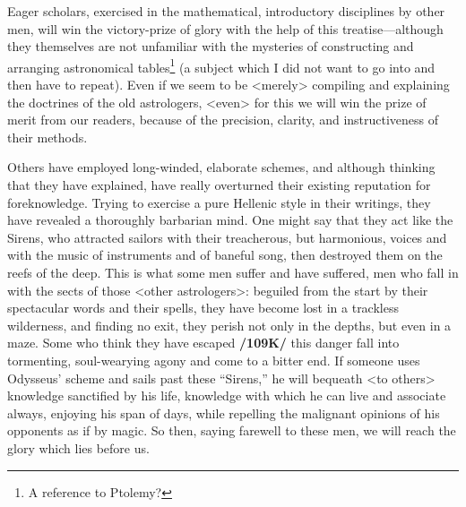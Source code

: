 Eager scholars, exercised in the mathematical, introductory disciplines by other men, will win the victory-prize of glory with the help of this treatise—although they themselves are not
unfamiliar with the mysteries of constructing and arranging astronomical tables\footnote{A reference to Ptolemy?} (a subject which I did not want to go into and then have to repeat). Even if we seem to be <merely> compiling and explaining the doctrines of the old astrologers, <even> for this we will win the prize of merit from our readers, because of the precision, clarity, and instructiveness of their methods.

Others have employed long-winded, elaborate schemes, and although thinking that they have explained, have really overturned their existing reputation for foreknowledge. Trying to exercise a pure Hellenic style in their writings, they have revealed a thoroughly barbarian mind. One might say that they
act like the Sirens, who attracted sailors with their treacherous, but harmonious, voices and with the music
of instruments and of baneful song, then destroyed them on the reefs of the deep. This is what some men suffer and have suffered, men who fall in with the sects of those <other astrologers>: beguiled from the start by their spectacular words and their spells, they have become lost in a trackless wilderness, and finding no exit, they perish not only in the depths, but even in a maze. Some who think they have escaped \textbf{/109K/} this danger fall into tormenting, soul-wearying agony and come to a bitter end. If someone uses Odysseus’
scheme and sails past these “Sirens,” he will bequeath <to others> knowledge sanctified by his life, knowledge with which he can live and associate always, enjoying his span of days, while repelling the malignant opinions of his opponents as if by magic. So then, saying farewell to these men, we will reach the glory which lies before us.

\newpage
